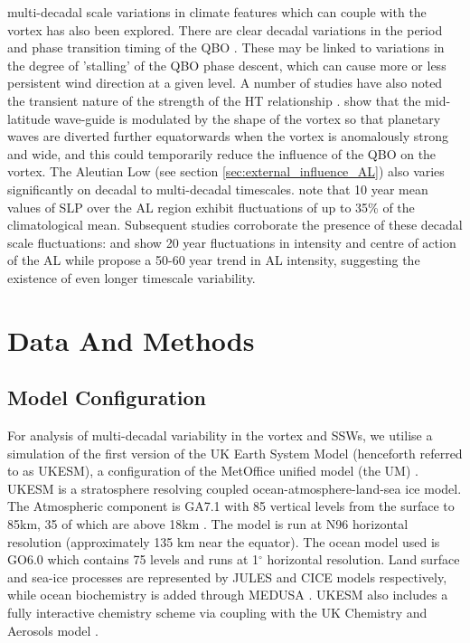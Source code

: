 multi-decadal scale variations in climate features which can couple with the vortex has also been explored. There are clear decadal variations in the period and phase transition timing of the QBO \citep{pascoeQuasibiennial2005b,ansteyResponse2008b,Yang2016}. These may be linked to variations in the degree of 'stalling' of the QBO phase descent, which can cause more or less persistent wind direction at a given level.  A number of studies have also noted the transient nature of the strength of the HT relationship \citep{luDecadalscale2008,luMechanisms2014c,ansteyResponse2008b,ospreyClimatology2010b}. \cite{luDecadalscale2008,luMechanisms2014c} show that the mid-latitude wave-guide is modulated by the shape of the vortex so that planetary waves are diverted further equatorwards when the vortex is anomalously strong and wide, and this could temporarily reduce the influence of the QBO on the vortex. The Aleutian Low (see section \ref{sec:external_influence_AL}) also varies significantly on decadal to multi-decadal timescales. \cite{overlandDecadal1999b} note that 10 year mean values of SLP over the AL region exhibit fluctuations of up to 35\% of the climatological mean. Subsequent studies corroborate the presence of these decadal scale fluctuations: \cite{SUGIMOTO2009} and \cite{Minobe} show 20 year fluctuations in intensity and centre of action of the AL while \cite{Raible2005} propose a 50-60 year trend in AL intensity, suggesting the existence of even longer timescale variability. 

\section{Data And Methods}
\subsection{Model Configuration}
\label{sec:model_config}
For analysis of multi-decadal variability in the vortex and SSWs, we utilise a simulation of the first version of the UK Earth System Model (henceforth referred to as UKESM), a configuration of the MetOffice unified model (the UM) \citep{mulcahyImproved2018b}. UKESM is a stratosphere resolving coupled ocean-atmosphere-land-sea ice model. The Atmospheric component is GA7.1 with 85 vertical levels from the surface to 85km, 35 of which are above 18km \citep{waltersMet2019b, williamsMet2018b}. The model is run at N96 horizontal resolution (approximately 135 km near the equator). The ocean model used is GO6.0 \citep{Storkey2018} which contains 75 levels and runs at 1${^\circ}$ horizontal resolution. Land surface and sea-ice processes are represented by JULES \citep[GL7.0,][]{waltersMet2019b} and CICE  \cite[GSI8.1,][]{ridleySea2018b} models respectively, while ocean biochemistry is added through MEDUSA \citep{Yool2013}. UKESM also includes a fully interactive chemistry scheme via coupling with the UK Chemistry and Aerosols model \citep[UKCA,][]{mulcahyImproved2018b}.

